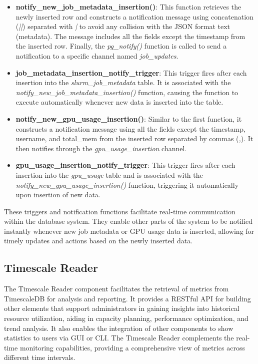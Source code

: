 \begin{itemize}
    \item \textbf{notify\_new\_job\_metadata\_insertion()}: This function retrieves the newly inserted row and constructs a notification message using concatenation (\textit{||}) separated with \textit{|} to avoid any collision with the JSON format text (metadata). The message includes all the fields except the timestamp from the inserted row. Finally, the \textit{pg\_notify()} function is called to send a notification to a specific channel named \textit{job\_updates}.
    \item \textbf{job\_metadata\_insertion\_notify\_trigger}: This trigger fires after each insertion into the \textit{slurm\_job\_metadata} table. It is associated with the \\
    \textit{notify\_new\_job\_metadata\_insertion()} function, causing the function to execute automatically whenever new data is inserted into the table.
    \item \textbf{notify\_new\_gpu\_usage\_insertion()}: Similar to the first function, it constructs a notification message using all the fields except the timestamp, username, and total\_mem from the inserted row separated by commas (\textit{,}). It then notifies through the \textit{gpu\_usage\_insertion} channel.
    \item \textbf{gpu\_usage\_insertion\_notify\_trigger}: This trigger fires after each insertion into the \textit{gpu\_usage} table and is associated with the \textit{notify\_new\_gpu\_usage\_insertion()} function, triggering it automatically upon insertion of new data.
\end{itemize}

These triggers and notification functions facilitate real-time communication within the database system. They enable other parts of the system to be notified instantly whenever new job metadata or GPU usage data is inserted, allowing for timely updates and actions based on the newly inserted data.

\subsection{Timescale Reader}
The Timescale Reader component facilitates the retrieval of metrics from TimescaleDB for analysis and reporting. It provides a RESTful API for building other elements that support administrators in gaining insights into historical resource utilization, aiding in capacity planning, performance optimization, and trend analysis. It also enables the integration of other components to show statistics to users via GUI or CLI. The Timescale Reader complements the real-time monitoring capabilities, providing a comprehensive view of metrics across different time intervals.

